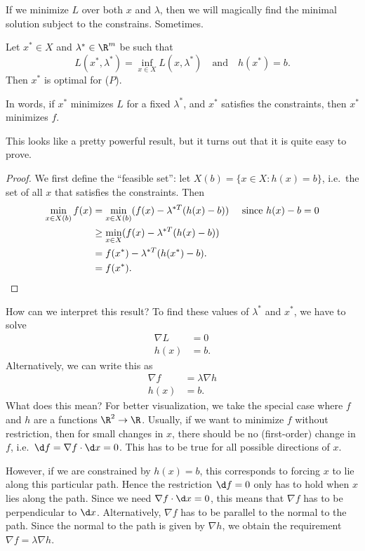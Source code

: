 \documentclass[a4paper]{article}
\begin{document}
If we minimize $L$ over both $x$ and $\lambda$, then we will magically find the minimal solution subject to the constrains. Sometimes.

\begin{thm}
  Let $x^*\in X$ and $\lambda^*\in \R^m$ be such that
  \[
    L(x^* ,\lambda^*) = \inf_{x\in X}L(x, \lambda^*)\quad\text{and}\quad h(x^*) = b.
  \]
  Then $x^*$ is optimal for ($P$).

  In words, if $x^*$ minimizes $L$ for a fixed $\lambda^*$, and $x^*$ satisfies the constraints, then $x^*$ minimizes $f$.
\end{thm}
This looks like a pretty powerful result, but it turns out that it is quite easy to prove.

\begin{proof}
  We first define the ``feasible set'': let $X(b) = \{x\in X: h(x) = b\}$, i.e.\ the set of all $x$ that satisfies the constraints. Then
  \begin{align*}
    \min_{x\in X(b)} f(x) &= \min_{x\in X(b)} (f(x) - \lambda^{*T}(h(x) - b))\quad\text{ since $h(x) - b = 0$}\\
    &\geq \min_{x\in X} (f(x) - \lambda^{*T}(h(x) - b))\\
    &= f(x^*) - \lambda^{*T}(h(x^*) - b).\\
    &= f(x^*).\qedhere
  \end{align*}
\end{proof}
How can we interpret this result? To find these values of $\lambda^*$ and $x^*$, we have to solve
\begin{align*}
  \nabla L &= 0\\
  h(x) &= b.
\end{align*}
Alternatively, we can write this as
\begin{align*}
  \nabla f &= \lambda \nabla h\\
  h(x) &= b.
\end{align*}
What does this mean? For better visualization, we take the special case where $f$ and $h$ are a functions $\R^2 \to \R$. Usually, if we want to minimize $f$ without restriction, then for small changes in $x$, there should be no (first-order) change in $f$, i.e.\ $\d f = \nabla f\cdot \d x = 0$. This has to be true for all possible directions of $x$.

However, if we are constrained by $h(x) = b$, this corresponds to forcing $x$ to lie along this particular path. Hence the restriction $\d f = 0$ only has to hold when $x$ lies along the path. Since we need $\nabla f\cdot \d x = 0$, this means that $\nabla f$ has to be perpendicular to $\d x$. Alternatively, $\nabla f$ has to be parallel to the normal to the path. Since the normal to the path is given by $\nabla h$, we obtain the requirement $\nabla f = \lambda \nabla h$.
\end{document}
